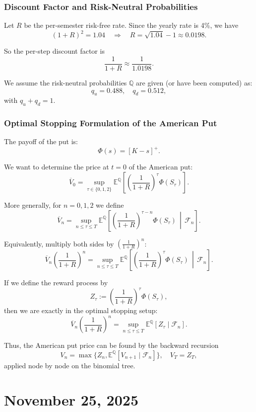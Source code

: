 \documentclass[12pt,a4paper]{article}
\theoremstyle{definition}
\begin{document}
\subsubsection{Discount Factor and Risk-Neutral Probabilities}

Let $R$ be the per-semester risk-free rate. Since the yearly rate is 4\%, we have
\[
(1 + R)^2 = 1.04 \quad \Longrightarrow \quad R = \sqrt{1.04} - 1 \approx 0.0198.
\]

So the per-step discount factor is
\[
\frac{1}{1 + R} \approx \frac{1}{1.0198}.
\]

We assume the risk-neutral probabilities $\mathbb{Q}$ are given (or have been computed) as:
\[
q_u = 0.488, \quad q_d = 0.512,
\]
with $q_u + q_d = 1$.

\subsubsection{Optimal Stopping Formulation of the American Put}

The payoff of the put is:
\[
\Phi(s) = [K - s]^+.
\]

We want to determine the price at $t = 0$ of the American put:
\[
\overline{V}_0 = \sup_{\tau \in \{0,1,2\}} \mathbb{E}^{\mathbb{Q}}\left[\left(\frac{1}{1+R}\right)^\tau \Phi(S_\tau)\right].
\]

More generally, for $n = 0, 1, 2$ we define
\[
\overline{V}_n = \sup_{n \leq \tau \leq T} \mathbb{E}^{\mathbb{Q}}\left[\left(\frac{1}{1+R}\right)^{\tau - n} \Phi(S_\tau) \,\middle|\, \mathcal{F}_n\right].
\]

Equivalently, multiply both sides by $\left(\frac{1}{1+R}\right)^n$:
\[
\overline{V}_n \left(\frac{1}{1+R}\right)^n = \sup_{n \leq \tau \leq T} \mathbb{E}^{\mathbb{Q}}\left[\left(\frac{1}{1+R}\right)^\tau \Phi(S_\tau) \,\middle|\, \mathcal{F}_n\right].
\]

If we define the reward process by
\[
Z_\tau := \left(\frac{1}{1+R}\right)^\tau \Phi(S_\tau),
\]
then we are exactly in the optimal stopping setup:
\[
\overline{V}_n \left(\frac{1}{1+R}\right)^n = \sup_{n \leq \tau \leq T} \mathbb{E}^{\mathbb{Q}}[Z_\tau \mid \mathcal{F}_n].
\]

Thus, the American put price can be found by the backward recursion
\[
V_n = \max\{Z_n, \mathbb{E}^{\mathbb{Q}}[V_{n+1} \mid \mathcal{F}_n]\}, \quad V_T = Z_T,
\]
applied node by node on the binomial tree.

\newpage
\section{November 25, 2025}
\end{document}
